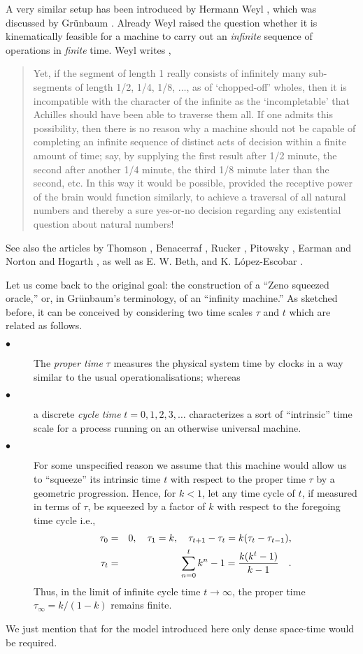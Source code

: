  A very similar setup has been introduced by Hermann Weyl
 \cite{weyl:49}, which was discussed
 by
 Gr\"unbaum
\cite[p. 630]{gruenbaum:74}.
Already Weyl raised the question whether it is kinematically feasible
for a machine to carry out an {\em infinite} sequence of operations in
{\em finite} time.
Weyl writes \cite[p. 42]{weyl:49},
\begin{quote}
Yet, if the segment of length 1 really consists of infinitely many
sub-segments of length 1/2, 1/4, 1/8,
$\ldots$, as of `chopped-off' wholes, then it is incompatible with the
character of the infinite as the `incompletable' that Achilles should
have been able to traverse them all. If one admits this possibility,
then there is no reason why a machine should not be capable of
completing an infinite sequence of distinct acts of decision within a
finite amount of time; say, by supplying the first result after 1/2
minute, the second after another 1/4 minute, the third 1/8 minute later
than the second, etc. In this way it would be possible, provided the
receptive power of the brain would function similarly, to achieve a
traversal of all natural numbers and thereby a sure yes-or-no decision
regarding any existential question about natural numbers!
\end{quote}

See also
the articles by Thomson \cite{thom:54}, Benacerraf \cite{benna:62},
Rucker \cite{rucker},
Pitowsky \cite{pit:90}, Earman and Norton \cite{ear-nor:93} and Hogarth
\cite{hogarth1,hogarth2},
as well as
 E. W. Beth,
 \cite[p. 492]{beth-59}
 and
K. L\'opez-Escobar
 \cite{le-91}.

 Let us come back to the original goal: the construction of a
``Zeno squeezed oracle,''
 or, in Gr\"unbaum's terminology, of an  ``infinity machine.''
As sketched before, it
can be conceived by considering two
time scales $\tau$ and $t$
which are related as follows.
\begin{description}
\item[$\bullet$]
The
 {\em proper time} $\tau$ measures the physical system time by clocks
 in a way similar to the usual operationalisations; whereas
\item[$\bullet$]
 a discrete {\it cycle time} $t=0,1,2,3,\ldots$ characterizes a sort of
 ``intrinsic'' time scale for a process  running on an otherwise
universal machine.
\item[$\bullet$]
 For some  unspecified
 reason we assume that this machine would allow us to
 ``squeeze'' its intrinsic time  $t$  with respect to the proper time
 $\tau$ by a geometric progression. Hence, for $k<1$, let
 any time cycle of $t$, if measured in terms of $\tau$, be squeezed by
 a factor of $k$ with respect to the foregoing time cycle
i.e.,
 \begin{eqnarray}
 \tau_0&=&0,\quad \tau_1=k ,\quad \tau_{t+1}-\tau_t =k(\tau_t
-\tau_{t-1}),
\\
 \tau_{t}&=&\sum_{n=0}^tk^n-1={k(k^t-1)\over k-1}\quad .
 \end{eqnarray}
Thus, in the limit
 of infinite cycle time $t\rightarrow \infty$, the proper time
 $\tau_\infty = k/(1-k)$ remains finite.
\end{description}
We just mention that for the model introduced here
only
dense space-time would be required.

